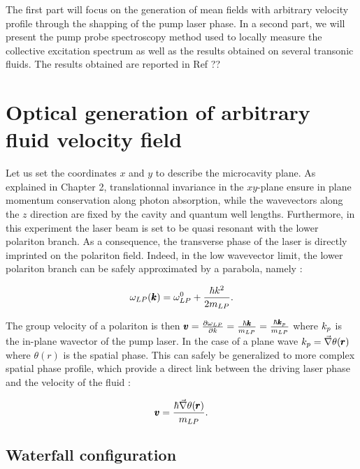 The first part will focus on the generation of mean fields with arbitrary velocity profile through the shapping of the pump laser phase. In a second part, we will present the pump probe spectroscopy method used to locally measure the collective excitation spectrum as well
as the results obtained on several transonic fluids. The results obtained are reported in Ref ??

\section{Optical generation of arbitrary fluid velocity field}


Let us set the coordinates $x$ and $y$ to describe the microcavity plane. As explained in Chapter 2, translationnal invariance in the $xy$-plane ensure in plane momentum conservation along photon absorption, while the wavevectors along the
$z$ direction are fixed by the cavity and quantum well lengths. Furthermore, in this experiment the laser beam is set to be quasi resonant with the lower polariton branch. As a consequence, the transverse phase of the laser is directly imprinted on the polariton field.
Indeed, in the low wavevector limit, the lower polariton branch can be safely approximated by a parabola, namely :

\begin{equation}
    \omega_{LP}(\pmb{k}) = \omega_{LP}^0 + \dfrac{\hbar k^2}{2m_{LP}}.
\end{equation}

The group velocity of a polariton is then $\pmb{v} = \frac{\partial \omega_{LP}}{\partial k} = \frac{\hbar \pmb{k}}{m_{LP}}= \frac{\hbar \pmb{k}_p}{m_{LP}}$ where $k_p$ is the in-plane wavector of the pump laser.
In the case of a plane wave $k_p=\vec{\nabla}\theta(\pmb{r})$ where $\theta(r)$ is the spatial phase. This can safely be generalized to more complex spatial phase profile,
which provide a direct link between the driving laser phase and the velocity of the fluid :

\begin{equation}
    \pmb{v} = \dfrac{\hbar \vec{\nabla} \theta(\pmb{r})}{m_{LP}} .
\end{equation}

\subsection{Waterfall configuration}

